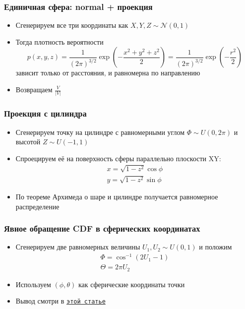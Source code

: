 \documentclass[10pt]{beamer}
\begin{document}
\begin{frame}[fragile]
\frametitle{Единичная сфера: normal + проекция}
\begin{itemize}
\item Сгенерируем все три координаты как \begin{math}X,Y,Z\sim \mathcal N(0,1)\end{math}
\pause
\item Тогда плотность вероятности \begin{equation*}p(x,y,z)=\frac{1}{(2\pi)^{3/2}}\exp\left(-\frac{x^2+y^2+z^2}{2}\right)=\frac{1}{(2\pi)^{3/2}}\exp\left(-\frac{r^2}{2}\right)\end{equation*} зависит только от расстояния, и равномерна по направлению
\pause
\item Возвращаем \begin{math}\frac{V}{|V|}\end{math}
\end{itemize}
\end{frame}

\begin{frame}[fragile]
\frametitle{Проекция с цилиндра}
\begin{itemize}
\item Сгенерируем точку на цилиндре с равномерными углом \begin{math}\Phi \sim U(0,2\pi)\end{math} и высотой \begin{math}Z\sim U(-1,1)\end{math}
\pause
\item Спроецируем её на поверхность сферы параллельно плоскости XY:
\begin{gather*}
x = \sqrt{1-z^2}\cos\phi \\
y = \sqrt{1-z^2}\sin\phi
\end{gather*}
\pause
\item По теореме Архимеда о шаре и цилиндре получается равномерное распределение
\end{itemize}
\end{frame}

\begin{frame}[fragile]
\frametitle{Явное обращение CDF в сферических координатах}
\begin{itemize}
\item Сгенерируем две равномерных величины \begin{math}U_1,U_2\sim U(0,1)\end{math} и положим
\begin{gather*}
\Phi = \cos^{-1}(2U_1-1) \\
\Theta = 2\pi U_2
\end{gather*}
\pause
\item Используем \begin{math}(\phi,\theta)\end{math} как сферические координаты точки
\pause
\item Вывод смотри в \href{https://www.bogotobogo.com/Algorithms/uniform_distribution_sphere.php}{\texttt{этой статье}}
\end{itemize}
\end{frame}
\end{document}
